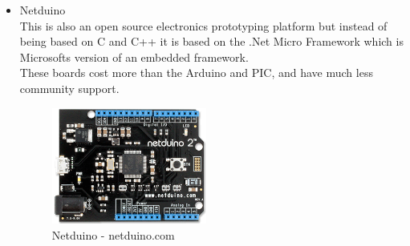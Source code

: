 \begin{itemize}
\item Netduino
\\This is also an open source electronics prototyping platform but instead of being based on C and C++ it is based on the .Net Micro Framework which is Microsofts version of an embedded framework.
\\These boards cost more than the Arduino and PIC, and have much less community support.
\begin{figure}[h]
\centering
        \includegraphics[width=2.0in] {Images/netduino.png}
        \caption{Netduino - netduino.com}
        \label{Netduino}
\end{figure}


\end{itemize}
